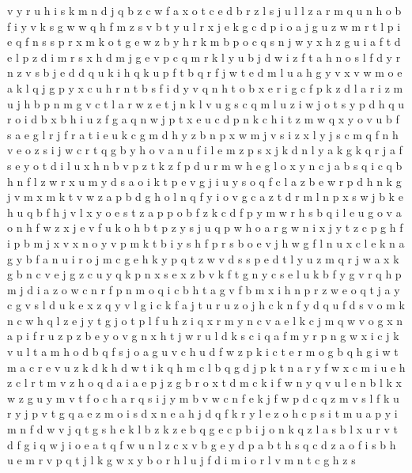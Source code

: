\documentclass{article}
\begin{document}
v y r u h i s k m n d j q b z c w f a x o
t c e d b r z l s j
u l
l z a r m q u n h o b f i y v k s g w
w q h f m z s v b t y u l r x j e k g c d p i o a
j g u z w m r t l p i e q f n s
s p r x m k o t g e w z b y h
r k m b p o c q s n j w y x h z g u i a f t d e l
p z
d i m r s x
h d m j
g e v p c q m r k l y u b j d w i z f t a h n o s
l f d y r n z v s b j e
d
d q u
k
i h q k u p f
t
b q r f j w t e d m l u a h g y v x
v w m o e a k l q j g p y x c u h r n t b s f i d
y v q n h t o b x e r i g c f p k z
d l a r i z m u j h
b p n m g v c t l a r w z
e t j n k l v u g s
c q m l u z i w j o t s y p d
h q
u r o i d b x
b h i u
z f g a q n w j p t x e u c
d p n k c h i t z m w q x y o v u b f s a e g l r j
f r a t i e u k c g m d h y z b n p x w
m j v s
i z x l y j s c m q f n h v e o
z s i j
w c r t q g b y h o v a n u f i l e m z p s x j k d
n l y a k
g k q r j a f s e y o t d i l u x h n b v p z
t k z f p d u r m w h e g l o x y n c j a b s q i
c q b h n f l z w r x u m y d s a o i k t p e v g j
i u y s o q f c l a z b e w r p d h n k g j v m x
m k t v w z a p b d g h o l n q
f y i o v g c a z t d r m l n p x s w j b k e h u q
b f h j v l x y o e s t z a p
p o b f
z k c d f p y m w r h s b q i l e u g o v a
o n h f w z x j
e v f u k o h b t p
z y s j u q p w h o a r g
w n i x j y t z c p
g h f i p b m j x
v x n
o y
v p m k t b i y s
h f
p r s b o e v j h w g f l n u x c
l e k n a g y
b f a n u i r o j m c g e h k y p q t z w v d s
s p e d t l y u z m q r j w a x k g b n c v
e j g z c u y q k p n x
s e x z b v k f t g n y c
s e l u k b f y g v r q h p m j d i a z o w c n
r f p n m o q i c b h t a g v
f b m x i h n p r z w e o q t j a y c g v s l d u k
e x z q y v l g i c k f a j t u
r u z o j h c k n f y d q
u f d s v o m k n c w h q l z e j y t g
j o t p l f u h z i q x r m y n c v a
e l k c j m q w v o g x n a p i f r u z
p z b e y o v g n x h t j w r u l d k s c i q a f m
y r p n g w x i c j k v u l t a m h o d b q f s
j o a g u v c h
u d f w z p k i c t e r m o g
b q h g i w t m a c r e v u z k d
k h
d w t i k q h m c l b
q g d j p k t n a r y f w x c m i u e h z
c l r t m v z h o q d a i
a e p j z g b r o x t d m c k i f w n y q v u l
e n b l k x w z g u y m v t f o c h a r q s i
j y m b v
w c n f
e k j f w p d c q z m v s
l f k u r y j p v t g q a e z m o i s d x n
e a h
j d q f k r y l e z o h c p s i t m u a
p y i m n f d w v j q t g s h e k l b z
k z e b q
g e c p b i j o n k q z l a s
b l x u r v t d f g i q w j
i o e a t q f w u n l z c x v b
g e y d p a b t
h s q
c d z a o f i s b h u e m r v p q t j l k g w x y
b
o r h l u
j f d i m
i o r l v m n t c g h z s
\end{document}
